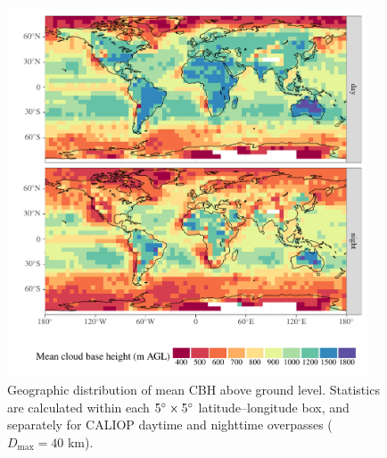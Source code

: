 \documentclass[essd,manuscript]{copernicus}\usepackage[]{graphicx}\usepackage[]{color}
\newenvironment{knitrout}{}{} %
\begin{document}
\begin{figure}
  \centering
\begin{knitrout}
\color{fgcolor}

{\centering \includegraphics[width=0.95\textwidth]{figure/method-cbase-base-1} 

}



\end{knitrout}
  \caption{Geographic distribution of mean CBH above ground
    level.  Statistics are calculated within each $5^{\circ}\times 5^{\circ}$
    latitude--longitude box, and separately for CALIOP daytime and nighttime
    overpasses ($D_\text{max} = 40$ km).}
  \label{fig:geo}
\end{figure}
\end{document}
